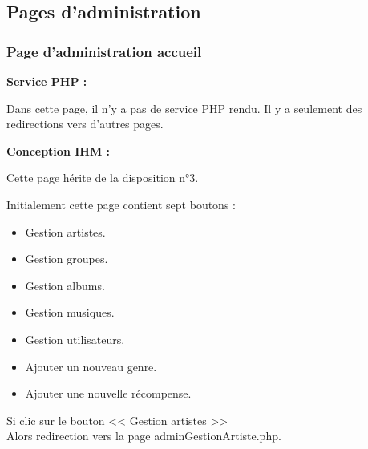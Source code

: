 

	\clearpage

	\subsection{Pages d'administration}
		\subsubsection{Page d'administration accueil}

			\begin{paragraphe}
				\textbf{Service PHP :}
			\end{paragraphe}

			\begin{paragraphe}
				Dans cette page, il n'y a pas de service PHP rendu. Il y a seulement des redirections vers d'autres pages.
			\end{paragraphe}

			\begin{paragraphe}
				\textbf{Conception IHM :}
			\end{paragraphe}

			\begin{paragraphe}
				Cette page hérite de la disposition n°3. \par
				Initialement cette page contient sept boutons :
				\begin{itemize}
					\item Gestion artistes.
					\item Gestion groupes.
					\item Gestion albums.
					\item Gestion musiques.
					\item Gestion utilisateurs.
					\item Ajouter un nouveau genre.
					\item Ajouter une nouvelle récompense.
				\end{itemize}
			\end{paragraphe}


			\begin{paragraphe}
				Si clic sur le bouton << Gestion artistes >> \\
				Alors redirection vers la page adminGestionArtiste.php.
			\end{paragraphe}

